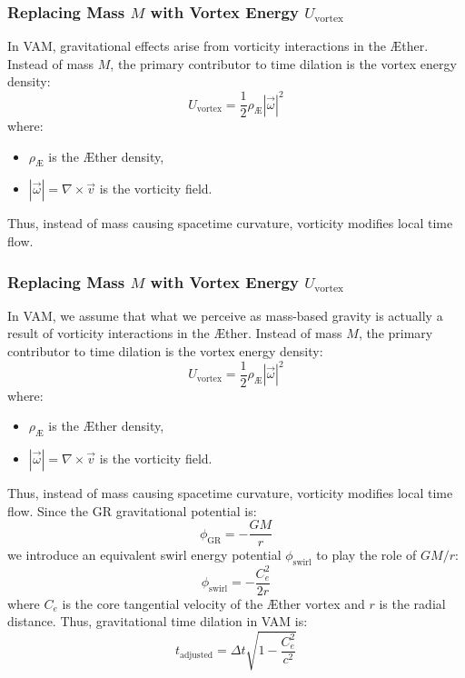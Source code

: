 \subsubsection*{Replacing Mass $M$ with Vortex Energy $U_{\text{vortex}}$}
In VAM, gravitational effects arise from vorticity interactions in the \AE ther. Instead of mass $M$, the primary contributor to time dilation is the vortex energy density:
\begin{equation}
    U_{\text{vortex}} = \frac{1}{2} \rho_{\text{\AE}} |\vec{\omega}|^2
\end{equation}
where:
\begin{itemize}
    \item $\rho_{\text{\AE}}$ is the \AE ther density,
    \item $|\vec{\omega}| = \nabla \times \vec{v}$ is the vorticity field.
\end{itemize}
Thus, instead of mass causing spacetime curvature, vorticity modifies local time flow.


\subsubsection*{Replacing Mass $M$ with Vortex Energy $U_{\text{vortex}}$}
In VAM, we assume that what we perceive as mass-based gravity is actually a result of vorticity interactions in the \AE ther. Instead of mass $M$, the primary contributor to time dilation is the vortex energy density:
\begin{equation}
    U_{\text{vortex}} = \frac{1}{2} \rho_{\text{\AE}} |\vec{\omega}|^2
\end{equation}
where:
\begin{itemize}
    \item $\rho_{\text{\AE}}$ is the \AE ther density,
    \item $|\vec{\omega}| = \nabla \times \vec{v}$ is the vorticity field.
\end{itemize}
Thus, instead of mass causing spacetime curvature, vorticity modifies local time flow. Since the GR gravitational potential is:
\begin{equation}
    \phi_{\text{GR}} = -\frac{GM}{r}
\end{equation}
we introduce an equivalent swirl energy potential $\phi_{\text{swirl}}$ to play the role of $GM/r$:
\begin{equation}
    \phi_{\text{swirl}} = -\frac{C_e^2}{2r}
\end{equation}
where $C_e$ is the core tangential velocity of the \AE ther vortex and $r$ is the radial distance. Thus, gravitational time dilation in VAM is:
\begin{equation}
    t_{\text{adjusted}} = \Delta t \sqrt{1 - \frac{C_e^2}{c^2}}
\end{equation}

